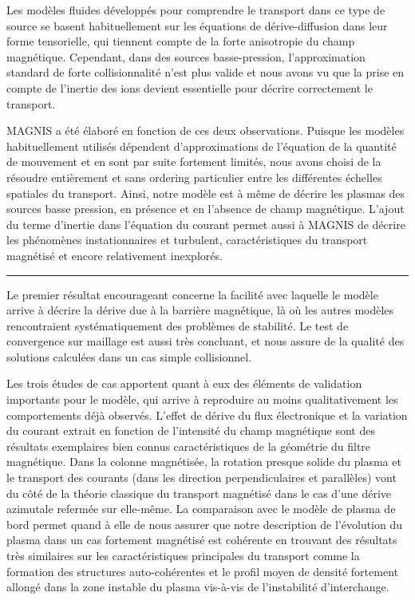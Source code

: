 Les modèles fluides développés pour comprendre le transport dans ce type de
source se basent habituellement sur les équations de dérive-diffusion dans leur
forme tensorielle, qui tiennent compte de la forte anisotropie du champ
magnétique.
Cependant, dans des sources basse-pression,
l'approximation standard de forte collisionnalité n'est plus
valide et nous avons vu que la prise en compte de l'inertie des ions devient
essentielle pour décrire correctement le transport. 



MAGNIS a été élaboré en fonction de ces deux observations. Puisque les modèles
habituellement utilisés dépendent d'approximations de
l'équation de la quantité de mouvement et en sont par suite fortement limités,
nous avons choisi de la résoudre entièrement et sans ordering particulier entre les
différentes échelles spatiales du transport. Ainsi, notre modèle est à même de
décrire les plasmas des sources basse pression, en présence et en l'absence de champ magnétique.
L'ajout du terme d'inertie dans l'équation du courant permet aussi à MAGNIS de
décrire les phénomènes instationnaires et turbulent, caractéristiques du
transport magnétisé et encore relativement inexplorés. 

\begin{center}
\rule{0.6\textwidth}{1pt}
\end{center}

Le premier résultat encourageant concerne la facilité avec laquelle le modèle
arrive à décrire la dérive due à la barrière magnétique, là où les autres
modèles rencontraient systématiquement des problèmes de stabilité. Le test de
convergence sur maillage est aussi très concluant, et nous assure de la qualité
des solutions calculées dans un cas simple collisionnel. 

Les trois études de cas apportent quant à eux des éléments de validation
importants pour le modèle, qui arrive à reproduire au moins qualitativement les
comportements déjà observés. L'effet de dérive du flux électronique et la
variation du courant extrait en fonction de l'intensité du champ magnétique sont des
résultats exemplaires bien connus caractéristiques de la géométrie du filtre
magnétique.
Dans la colonne magnétisée, la rotation presque solide du plasma et le
transport des courants (dans les direction perpendiculaires et parallèles) vont
du côté de la théorie classique du transport magnétisé dans le cas d'une dérive
azimutale refermée sur elle-même.
La comparaison avec le modèle de plasma de bord permet quand à elle de nous
assurer que notre description de l'évolution du plasma dans un cas fortement
magnétisé est cohérente en trouvant des résultats très similaires sur les
caractéristiques principales du transport comme la formation des structures
auto-cohérentes et le profil moyen de densité fortement allongé dans la zone
instable du plasma vis-à-vis de l'instabilité d'interchange.


